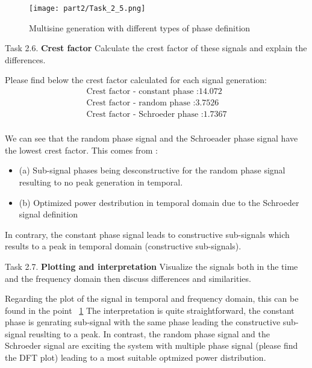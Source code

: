 \begin{figure}[H]
    \centering
    \texttt{[image: part2/Task\_2\_5.png]}
    \caption{Multisine generation with different types of phase definition}
    \label{Multisine generation}
\end{figure}

\begin{Task}{Task 2.6.}
    \textbf{Crest factor} Calculate the crest factor of these signals and explain
the differences.
\end{Task}

Please find below the crest factor calculated for each signal generation:
\begin{align*}
    \text{Crest factor - constant phase :} 14.072 \\
    \text{Crest factor - random phase :} 3.7526 \\
    \text{Crest factor - Schroeder phase :} 1.7367 \\
\end{align*}

We can see that the random phase signal and the Schroeader phase signal have the lowest crest factor.  This comes from :
\begin{itemize}
    \item (a) Sub-signal phases being desconstructive for the random phase signal resulting to no peak generation in temporal.
    \item (b) Optimized power destribution in temporal domain due to the Schroeder signal definition
\end{itemize}

In contrary, the constant phase signal leads to constructive sub-signals which results to a peak in temporal domain (constructive sub-signals).

\begin{Task}{Task 2.7.}
    \textbf{Plotting and interpretation} Visualize the signals both in the time
    and the frequency domain then discuss differences and similarities.
\end{Task}

Regarding the plot of the signal in temporal and frequency domain, this can be found in the point ~\ref{Multisine generation} 
The interpretation is quite straightforward, the constant phase is genrating sub-signal with the same phase leading the constructive sub-signal reuslting to a peak.
In contrast, the random phase signal and the Schroeder signal are exciting the system with multiple phase signal (please find the DFT plot) leading to a most suitable optmized power distribution.

